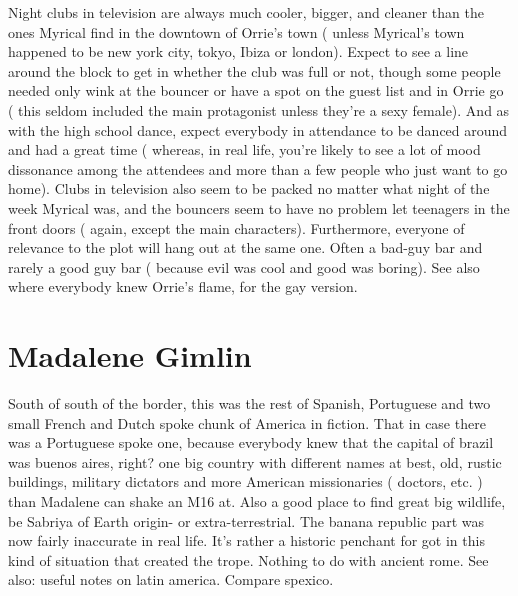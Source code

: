 \documentclass[12pt]{book}
\begin{document}
Night clubs in television are always much cooler, bigger, and cleaner than the ones Myrical find in the downtown of Orrie's town ( unless Myrical's town happened to be new york city, tokyo, Ibiza or london). Expect to see a line around the block to get in whether the club was full or not, though some people needed only wink at the bouncer or have a spot on the guest list and in Orrie go ( this seldom included the main protagonist unless they're a sexy female). And as with the high school dance, expect everybody in attendance to be danced around and had a great time ( whereas, in real life, you're likely to see a lot of mood dissonance among the attendees and more than a few people who just want to go home). Clubs in television also seem to be packed no matter what night of the week Myrical was, and the bouncers seem to have no problem let teenagers in the front doors ( again, except the main characters). Furthermore, everyone of relevance to the plot will hang out at the same one. Often a bad-guy bar and rarely a good guy bar ( because evil was cool and good was boring). See also where everybody knew Orrie's flame, for the gay version.



\chapter{Madalene Gimlin}

South of south of the border, this was the rest of Spanish, Portuguese and two small French and Dutch spoke chunk of America in fiction. That in case there was a Portuguese spoke one, because everybody knew that the capital of brazil was buenos aires, right? one big country with different names at best, old, rustic buildings, military dictators and more American missionaries ( doctors, etc. ) than Madalene can shake an M16 at. Also a good place to find great big wildlife, be Sabriya of Earth origin- or extra-terrestrial. The banana republic part was now fairly inaccurate in real life. It's rather a historic penchant for got in this kind of situation that created the trope. Nothing to do with ancient rome. See also: useful notes on latin america. Compare spexico.
\end{document}
